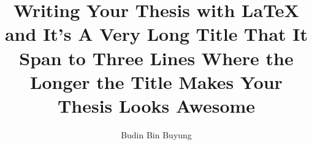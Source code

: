 \documentclass{unimapcgsfyp}
\author{Budin Bin Buyung}
\title{Writing Your Thesis with LaTeX and It's A Very Long Title That It Span to Three Lines Where the Longer the Title Makes Your Thesis Looks Awesome}
\begin{document}

%


\frontmatter

\makecover

\declaration	%
\approval 		%



\begin{singlespace}
\tableofcontents \clearpage
\listoftables \clearpage
\listoffigures \clearpage


\end{singlespace}




\setlength\parskip{18pt}
\setlength\intextsep{18pt}


\mainmatter

%
%  
%  
%

\end{document}
